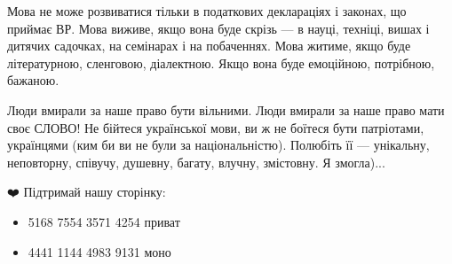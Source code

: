 Мова не може розвиватися тільки в податкових деклараціях
і законах, що приймає ВР. Мова виживе, якщо вона буде скрізь — в науці,
техніці, вишах і дитячих садочках, на семінарах і на побаченнях. Мова житиме,
якщо буде літературною, сленговою, діалектною. Якщо вона буде емоційною,
потрібною, бажаною. 

Люди вмирали за наше право бути вільними. Люди вмирали за наше право мати своє
СЛОВО! Не бійтеся української мови, ви ж не боїтеся бути патріотами, українцями
(ким би ви не були за національністю). Полюбіть її — унікальну, неповторну,
співучу, душевну, багату, влучну, змістовну. Я змогла)...

❤️ Підтримай нашу сторінку:

\begin{itemize}
  \item 5168 7554 3571 4254 приват
  \item 4441 1144 4983 9131 моно
\end{itemize}
